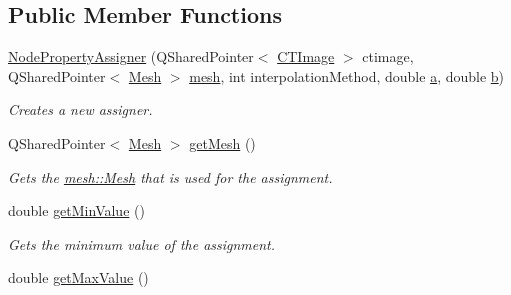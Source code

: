 \subsection*{Public Member Functions}
\begin{DoxyCompactItemize}
\item 
\hyperlink{classassignment_1_1_node_property_assigner_afc4761487858cccc6a66dfa949984e3a}{NodePropertyAssigner} (QSharedPointer$<$ \hyperlink{classctimage_1_1_c_t_image}{CTImage} $>$ ctimage, QSharedPointer$<$ \hyperlink{classmesh_1_1_mesh}{Mesh} $>$ \hyperlink{classassignment_1_1_node_property_assigner_a91e04d259955ce0ae93d02760ac2945e}{mesh}, int interpolationMethod, double \hyperlink{classassignment_1_1_node_property_assigner_a7bac7369b89b3351b2ff889114daaf6a}{a}, double \hyperlink{classassignment_1_1_node_property_assigner_a8d2dcf867efc99c60f076cc5d1d55114}{b})
\begin{DoxyCompactList}\small\item\em Creates a new assigner. \item\end{DoxyCompactList}\item 
\hypertarget{classassignment_1_1_node_property_assigner_a9c023c3f2d6dd830f6c64958650bf177}{
QSharedPointer$<$ \hyperlink{classmesh_1_1_mesh}{Mesh} $>$ \hyperlink{classassignment_1_1_node_property_assigner_a9c023c3f2d6dd830f6c64958650bf177}{getMesh} ()}
\label{classassignment_1_1_node_property_assigner_a9c023c3f2d6dd830f6c64958650bf177}

\begin{DoxyCompactList}\small\item\em Gets the \hyperlink{classmesh_1_1_mesh}{mesh::Mesh} that is used for the assignment. \item\end{DoxyCompactList}\item 
\hypertarget{classassignment_1_1_node_property_assigner_ae157e095fda36f722c9ddb3d2a2492af}{
double \hyperlink{classassignment_1_1_node_property_assigner_ae157e095fda36f722c9ddb3d2a2492af}{getMinValue} ()}
\label{classassignment_1_1_node_property_assigner_ae157e095fda36f722c9ddb3d2a2492af}

\begin{DoxyCompactList}\small\item\em Gets the minimum value of the assignment. \item\end{DoxyCompactList}\item 
\hypertarget{classassignment_1_1_node_property_assigner_a9ff48294b2759b8c46d2673cd3f87731}{
double \hyperlink{classassignment_1_1_node_property_assigner_a9ff48294b2759b8c46d2673cd3f87731}{getMaxValue} ()}
\label{classassignment_1_1_node_property_assigner_a9ff48294b2759b8c46d2673cd3f87731}


\end{DoxyCompactItemize}
